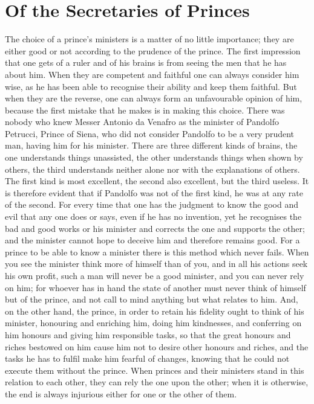 \documentclass[12pt,letterpaper]{memoir}
\begin{document}
\chapter{Of the Secretaries of Princes}

The choice of a prince's ministers is a matter of no little importance;
they are either good or not according to the prudence of the prince.
The first impression that one gets of a ruler and of his brains is
from seeing the men that he has about him. When they are competent
and faithful one can always consider him wise, as he has been able to
recognise their ability and keep them faithful. But when they are the
reverse, one can always form an unfavourable opinion of him, because
the first mistake that he makes is in making this choice. There was
nobody who knew Messer Antonio da Venafro as the minister of Pandolfo
Petrucci, Prince of Siena, who did not consider Pandolfo to be a very
prudent man, having him for his minister. There are three different
kinds of brains, the one understands things unassisted, the other
understands things when shown by others, the third understands neither
alone nor with the explanations of others. The first kind is most
excellent, the second also excellent, but the third useless. It is
therefore evident that if Pandolfo was not of the first kind, he was
at any rate of the second. For every time that one has the judgment to
know the good and evil that any one does or says, even if he has no
invention, yet he recognises the bad and good works or his minister
and corrects the one and supports the other; and the minister cannot
hope to deceive him and therefore remains good. For a prince to be
able to know a minister there is this method which never fails. When
you see the minister think more of himself than of you, and in all his
actions seek his own profit, such a man will never be a good minister,
and you can never rely on him; for whoever has in hand the state of
another must never think of himself but of the prince, and not call
to mind anything but what relates to him. And, on the other hand, the
prince, in order to retain his fidelity ought to think of his minister,
honouring and enriching him, doing him kindnesses, and conferring on
him honours and giving him responsible tasks, so that the great honours
and riches bestowed on him cause him not to desire other honours and
riches, and the tasks he has to fulfil make him fearful of changes,
knowing that he could not execute them without the prince. When princes
and their ministers stand in this relation to each other, they can
rely the one upon the other; when it is otherwise, the end is always
injurious either for one or the other of them.
\end{document}
